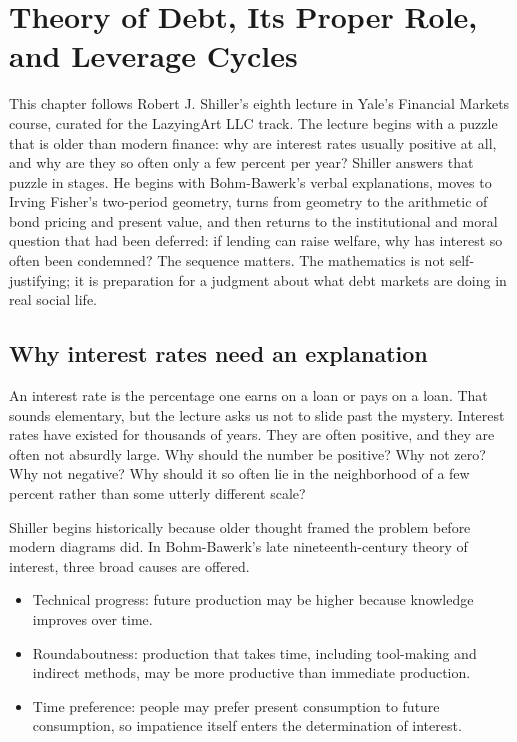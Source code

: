 \chapter{Theory of Debt, Its Proper Role, and Leverage Cycles}

This chapter follows Robert J. Shiller's eighth lecture in Yale's Financial Markets course, curated for the LazyingArt LLC track. The lecture begins with a puzzle that is older than modern finance: why are interest rates usually positive at all, and why are they so often only a few percent per year? Shiller answers that puzzle in stages. He begins with Bohm-Bawerk's verbal explanations, moves to Irving Fisher's two-period geometry, turns from geometry to the arithmetic of bond pricing and present value, and then returns to the institutional and moral question that had been deferred: if lending can raise welfare, why has interest so often been condemned? The sequence matters. The mathematics is not self-justifying; it is preparation for a judgment about what debt markets are doing in real social life.

\section{Why interest rates need an explanation}

An interest rate is the percentage one earns on a loan or pays on a loan. That sounds elementary, but the lecture asks us not to slide past the mystery. Interest rates have existed for thousands of years. They are often positive, and they are often not absurdly large. Why should the number be positive? Why not zero? Why not negative? Why should it so often lie in the neighborhood of a few percent rather than some utterly different scale?

Shiller begins historically because older thought framed the problem before modern diagrams did. In Bohm-Bawerk's late nineteenth-century theory of interest, three broad causes are offered.

\begin{itemize}
\item Technical progress: future production may be higher because knowledge improves over time.
\item Roundaboutness: production that takes time, including tool-making and indirect methods, may be more productive than immediate production.
\item Time preference: people may prefer present consumption to future consumption, so impatience itself enters the determination of interest.
\end{itemize}

